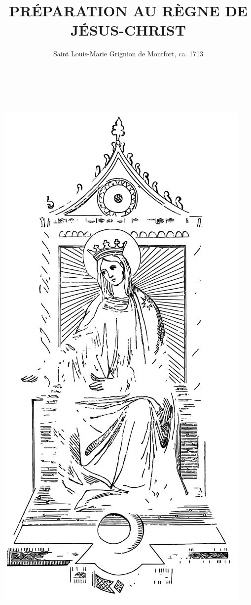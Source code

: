 \documentclass[paper=a5,pagesize=pdftex,fontsize=15pt,headinclude=on,twoside=off]{scrbook}
\title{PRÉPARATION AU RÈGNE DE JÉSUS-CHRIST}
\author{Saint Louis-Marie Grignion de Montfort, ca. 1713}
\begin{document}
\pagestyle{empty}
\hspace{0pt}
\vfill
\begin{center}
  \begin{minipage}{0.7\textwidth}
    \begin{center}
      {\headerfont\Huge \thetitle} \\
      \vspace{0.1\pageheight}
      {\headerfont\Large \theauthor}
    \end{center}
  \end{minipage}
  \\
  \vspace{0.1\pageheight}
  \includegraphics[height=0.4\pageheight]{th.jpg}
\end{center}
\vfill
\hspace{0pt}
\newpage
\end{document}
